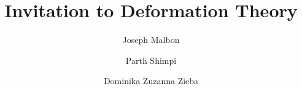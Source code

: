 \documentclass[10pt]{article}
\begin{document}
\title{\Huge{Invitation to Deformation Theory}}
\author[1]{Joseph Malbon}
\author[2]{Parth Shimpi}
\author[3]{Dominika Zuzanna Zieba}


\date{}

\maketitle

\tableofcontents

\vspace{1em}







\printbibliography
\end{document}
